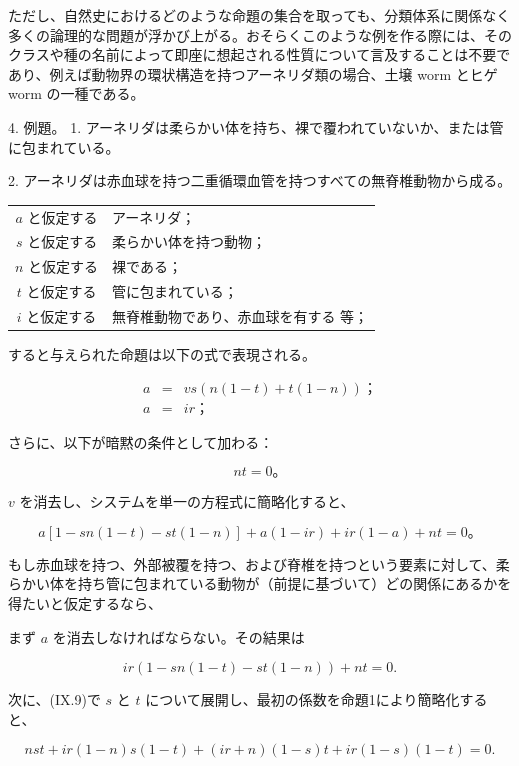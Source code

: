 \documentclass[a4paper,11pt,openany]{ltjsbook}
\begin{document}
ただし、自然史におけるどのような命題の集合を取っても、分類体系に関係なく多くの論理的な問題が浮かび上がる。おそらくこのような例を作る際には、そのクラスや種の名前によって即座に想起される性質について言及することは不要であり、例えば動物界の環状構造を持つアーネリダ類の場合、土壌 worm とヒゲ worm の一種である。

4. 例題。
1. アーネリダは柔らかい体を持ち、裸で覆われていないか、または管に包まれている。

2. アーネリダは赤血球を持つ二重循環血管を持つすべての無脊椎動物から成る。

\begin{tabular}{c l}
$a$ と仮定する &アーネリダ； \\
$s$ と仮定する &柔らかい体を持つ動物； \\
$n$ と仮定する &裸である； \\
$t$ と仮定する &管に包まれている； \\
$i$ と仮定する &無脊椎動物であり、赤血球を有する 等；
\end{tabular}

すると与えられた命題は以下の式で表現される。

\begin{eqnarray}
a &=& vs (n(1-t) + t(1-n))； \\
a &=& ir；
\end{eqnarray}

さらに、以下が暗黙の条件として加わる：

\begin{equation}
nt = 0。
\end{equation}

$v$ を消去し、システムを単一の方程式に簡略化すると、

\begin{equation}
a [1 - sn(1-t) - st(1-n)] + a (1-ir) + ir (1-a) + nt = 0。
\end{equation}

もし赤血球を持つ、外部被覆を持つ、および脊椎を持つという要素に対して、柔らかい体を持ち管に包まれている動物が（前提に基づいて）どの関係にあるかを得たいと仮定するなら、

まず $a$ を消去しなければならない。その結果は

\[
ir(1 - sn(1-t) - st(1-n)) + nt = 0.
\]

次に、(IX.9)で $s$ と $t$ について展開し、最初の係数を命題1により簡略化すると、

\begin{equation}
nst + ir(1-n)s(1-t) + (ir+n)(1-s)t + ir(1-s)(1-t) = 0.
\end{equation}
\end{document}
